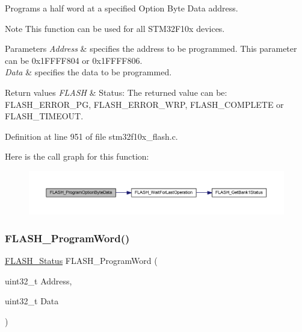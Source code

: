 Programs a half word at a specified Option Byte Data address. 

\begin{DoxyNote}{Note}
This function can be used for all S\+T\+M32\+F10x devices. 
\end{DoxyNote}

\begin{DoxyParams}{Parameters}
{\em Address} & specifies the address to be programmed. This parameter can be 0x1\+F\+F\+F\+F804 or 0x1\+F\+F\+F\+F806. \\
\hline
{\em Data} & specifies the data to be programmed. \\
\hline
\end{DoxyParams}

\begin{DoxyRetVals}{Return values}
{\em F\+L\+A\+SH} & Status\+: The returned value can be\+: F\+L\+A\+S\+H\+\_\+\+E\+R\+R\+O\+R\+\_\+\+PG, F\+L\+A\+S\+H\+\_\+\+E\+R\+R\+O\+R\+\_\+\+W\+RP, F\+L\+A\+S\+H\+\_\+\+C\+O\+M\+P\+L\+E\+TE or F\+L\+A\+S\+H\+\_\+\+T\+I\+M\+E\+O\+UT. \\
\hline
\end{DoxyRetVals}


Definition at line 951 of file stm32f10x\+\_\+flash.\+c.

Here is the call graph for this function\+:
\nopagebreak
\begin{figure}[H]
\begin{center}
\leavevmode
\includegraphics[width=350pt]{group___f_l_a_s_h___private___functions_ga1382ff9d4ded8a5c076fde4fff529d21_cgraph}
\end{center}
\end{figure}
\mbox{\label{group___f_l_a_s_h___private___functions_gaac9a2f400b92537bd42a6bd7cc237b11}} 
\subsubsection{\texorpdfstring{F\+L\+A\+S\+H\+\_\+\+Program\+Word()}{FLASH\_ProgramWord()}}
{\footnotesize\ttfamily \hyperlink{group___f_l_a_s_h___exported___types_gadc63a6f3404ff1f71229a66915e9cdc0}{F\+L\+A\+S\+H\+\_\+\+Status} F\+L\+A\+S\+H\+\_\+\+Program\+Word (\begin{DoxyParamCaption}\item[{uint32\+\_\+t}]{Address,  }\item[{uint32\+\_\+t}]{Data }\end{DoxyParamCaption})}




